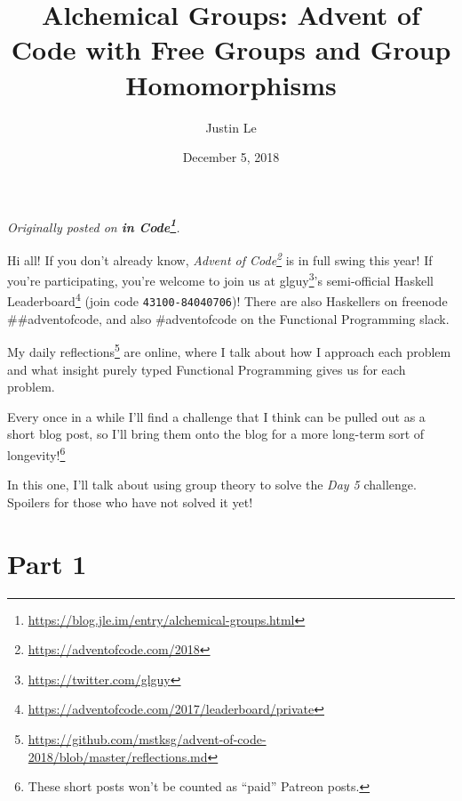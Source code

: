 \documentclass[]{article}
\title{Alchemical Groups: Advent of Code with Free Groups and Group Homomorphisms}
\author{Justin Le}
\date{December 5, 2018}
\renewcommand{\href}[2]{#2\footnote{\url{#1}}}
\begin{document}
\maketitle

\emph{Originally posted on
\textbf{\href{https://blog.jle.im/entry/alchemical-groups.html}{in Code}}.}

Hi all! If you don't already know,
\emph{\href{https://adventofcode.com/2018}{Advent of Code}} is in full swing
this year! If you're participating, you're welcome to join us at
\href{https://twitter.com/glguy}{glguy}'s semi-official
\href{https://adventofcode.com/2017/leaderboard/private}{Haskell Leaderboard}
(join code \texttt{43100-84040706})! There are also Haskellers on freenode
\#\#adventofcode, and also \#adventofcode on the Functional Programming slack.

My
\href{https://github.com/mstksg/advent-of-code-2018/blob/master/reflections.md}{daily
reflections} are online, where I talk about how I approach each problem and what
insight purely typed Functional Programming gives us for each problem.

Every once in a while I'll find a challenge that I think can be pulled out as a
short blog post, so I'll bring them onto the blog for a more long-term sort of
longevity!\footnote{These short posts won't be counted as ``paid'' Patreon
  posts.}

In this one, I'll talk about using group theory to solve the \emph{Day 5}
challenge. Spoilers for those who have not solved it yet!

\hypertarget{part-1}{%
\section{Part 1}\label{part-1}}
\end{document}
